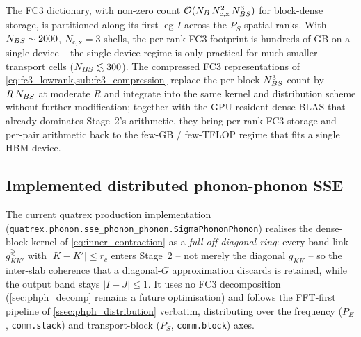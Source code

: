 The FC3 dictionary, with non-zero count
$\mathcal{O}(N_{B}\,N_\mathrm{c,x}^{2}\,N_{BS}^{3})$ for block-dense storage,
is partitioned along its first leg $I$ across the $P_S$ spatial
ranks. With $N_{BS}\sim 2000$, $N_\mathrm{c,x}=3$ shells, the per-rank
FC3 footprint is hundreds of GB on a single device -- the
single-device regime is only practical for much smaller transport
cells ($N_{BS}\lesssim 300$). The compressed FC3 representations of
\cref{eq:fc3_lowrank,sub:fc3_compression} replace the per-block
$N_{BS}^{3}$ count by $R\,N_{BS}$ at moderate $R$ and integrate into
the same kernel and distribution scheme without further
modification; together with the GPU-resident dense BLAS that
already dominates Stage~2's arithmetic, they bring per-rank FC3
storage and per-pair arithmetic back to the few-GB / few-TFLOP
regime that fits a single HBM device.

\subsection{Implemented distributed phonon-phonon SSE}
\label{ssec:phph_dist_impl}

The current quatrex production implementation
(\texttt{quatrex.phonon.sse\_phonon\_phonon.SigmaPhononPhonon})
realises the dense-block kernel of \cref{eq:inner_contraction} as a
\emph{full off-diagonal ring}: every band link $g_{KK'}^{\gtrless}$
with $|K-K'|\le r_c$ enters Stage~2 -- not merely the diagonal
$g_{KK}$ -- so the inter-slab coherence that a diagonal-$G$
approximation discards is retained, while the output band stays
$|I-J|\le 1$. It uses no FC3 decomposition
(\cref{sec:phph_decomp} remains a future optimisation) and follows
the FFT-first pipeline of \cref{ssec:phph_distribution} verbatim,
distributing over the frequency ($P_E$, \texttt{comm.stack}) and
transport-block ($P_S$, \texttt{comm.block}) axes.

